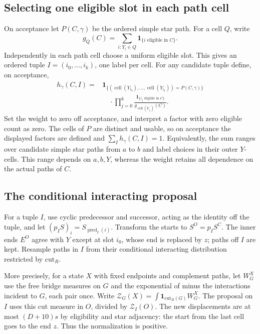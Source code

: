 \subsection{Selecting one eligible slot in each path cell}
On acceptance let $P(C,\gamma)$ be the ordered simple star path.
For a cell $Q$, write
\[
 g_Q(C)=\sum_{i:Y_i\in Q}\mathbf1_{\{i\text{ eligible in }C\}}.
\]
Independently in each path cell choose a uniform eligible slot.
This gives an ordered tuple $I=(i_0,\ldots,i_k)$, one label per
cell. For any candidate tuple define, on acceptance,
\[
\begin{split}
 h_\gamma(C,I)={}&
 \mathbf1_{\{(\operatorname{cell}(Y_{i_0}),\ldots,
                      \operatorname{cell}(Y_{i_k}))=P(C,\gamma)\}}\\
 &\quad\cdot\prod_{j=0}^k
       \frac{\mathbf1_{\{i_j\text{ eligible in }C\}}}
            {g_{\operatorname{cell}(Y_{i_j})}(C)}.
\end{split}
\]
Set the weight to zero off acceptance, and interpret a factor with
zero eligible count as zero. The cells of $P$ are distinct and
usable, so on acceptance the displayed factors are defined and
$\sum_Ih_\gamma(C,I)=1$. Equivalently, the sum ranges over candidate
simple star paths from $a$ to $b$ and label choices in their outer
$Y$-cells. This range depends on $a,b,Y$, whereas the weight retains
all dependence on the actual paths of $C$.

\subsection{The conditional interacting proposal}
For a tuple $I$, use cyclic predecessor and successor, acting as the
identity off the tuple, and let \((p_I S)_i=S_{\operatorname{pred}_I(i)}\).
Transform the starts to \(S^O=p_I S^C\). The inner ends \(E^O\) agree
with $Y$ except at slot \(i_0\), whose end is replaced by \(z\);
paths off $I$ are kept. Resample paths in \(I\) from their conditional
interacting distribution restricted by \(\mathrm{cut}_R\).

More precisely, for a state \(X\) with fixed endpoints and complement
paths, let \(W_G^X\) use the free bridge measures on \(G\) and the
exponential of minus the interactions incident to \(G\), each pair once.
Write \(\mathcal Z_G(X)=\int\mathbf 1_{\mathrm{cut}_R(G)} W_G^X\).
The proposal on \(I\) uses this cut measure in \(O\), divided by
\(\mathcal Z_I(O)\). The new displacements are at most \((D+10)s\)
by eligibility and star adjacency: the start from the last cell goes to
the end \(z\). Thus the normalization is positive.

